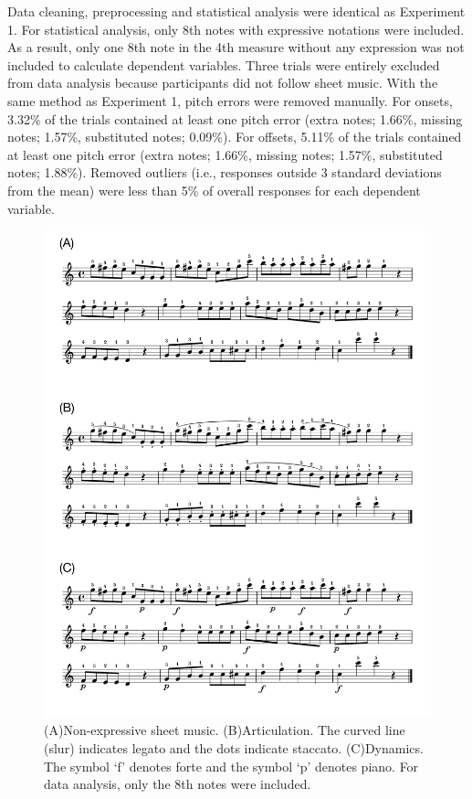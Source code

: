 \documentclass[
  english,
  man,floatsintext]{apa6}
\begin{document}
Data cleaning, preprocessing and statistical analysis were identical as Experiment 1. For statistical analysis, only 8th notes with expressive notations were included. As a result, only one 8th note in the 4th measure without any expression was not included to calculate dependent variables. Three trials were entirely excluded from data analysis because participants did not follow sheet music. With the same method as Experiment 1, pitch errors were removed manually. For onsets, 3.32\% of the trials contained at least one pitch error (extra notes; 1.66\%, missing notes; 1.57\%, substituted notes; 0.09\%). For offsets, 5.11\% of the trials contained at least one pitch error (extra notes; 1.66\%, missing notes; 1.57\%, substituted notes; 1.88\%). Removed outliers (i.e., responses outside 3 standard deviations from the mean) were less than 5\% of overall responses for each dependent variable.

\begin{figure}
\includegraphics[width=1\linewidth]{manuscript_files/figure-latex/stim-2-1} \caption{\label{fig:stimuli-2}(A)Non-expressive sheet music. (B)Articulation. The curved line (slur) indicates legato and the dots indicate staccato. (C)Dynamics. The symbol `f' denotes forte and the symbol `p' denotes piano. For data analysis, only the 8th notes were included.}\label{fig:stim-2}
\end{figure}
\end{document}
